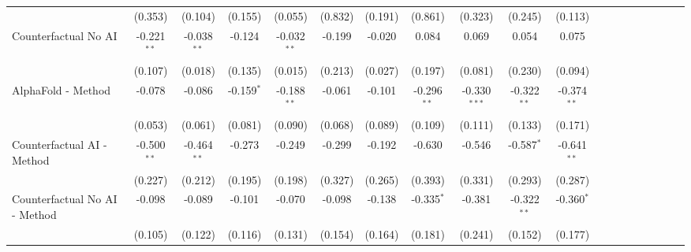 \begin{tabular}{lcccccccccccccccccc}
                                                              & (0.353)       & (0.104)       & (0.155)      & (0.055)       & (0.832) & (0.191) & (0.861)       & (0.323)        & (0.245)       & (0.113)       &       &       &       &       &      &      &      &   \\   
   Counterfactual No AI                                       & -0.221$^{**}$ & -0.038$^{**}$ & -0.124       & -0.032$^{**}$ & -0.199  & -0.020  & 0.084         & 0.069          & 0.054         & 0.075         &       &       &       &       &      &      &      &   \\   
                                                              & (0.107)       & (0.018)       & (0.135)      & (0.015)       & (0.213) & (0.027) & (0.197)       & (0.081)        & (0.230)       & (0.094)       &       &       &       &       &      &      &      &   \\   
   AlphaFold - Method                                         & -0.078        & -0.086        & -0.159$^{*}$ & -0.188$^{**}$ & -0.061  & -0.101  & -0.296$^{**}$ & -0.330$^{***}$ & -0.322$^{**}$ & -0.374$^{**}$ &       &       &       &       &      &      &      &   \\   
                                                              & (0.053)       & (0.061)       & (0.081)      & (0.090)       & (0.068) & (0.089) & (0.109)       & (0.111)        & (0.133)       & (0.171)       &       &       &       &       &      &      &      &   \\   
   Counterfactual AI - Method                                 & -0.500$^{**}$ & -0.464$^{**}$ & -0.273       & -0.249        & -0.299  & -0.192  & -0.630        & -0.546         & -0.587$^{*}$  & -0.641$^{**}$ &       &       &       &       &      &      &      &   \\   
                                                              & (0.227)       & (0.212)       & (0.195)      & (0.198)       & (0.327) & (0.265) & (0.393)       & (0.331)        & (0.293)       & (0.287)       &       &       &       &       &      &      &      &   \\   
   Counterfactual No AI - Method                              & -0.098        & -0.089        & -0.101       & -0.070        & -0.098  & -0.138  & -0.335$^{*}$  & -0.381         & -0.322$^{**}$ & -0.360$^{*}$  &       &       &       &       &      &      &      &   \\   
                                                              & (0.105)       & (0.122)       & (0.116)      & (0.131)       & (0.154) & (0.164) & (0.181)       & (0.241)        & (0.152)       & (0.177)       &       &       &       &       &      &      &      &   \\   

\end{tabular}
